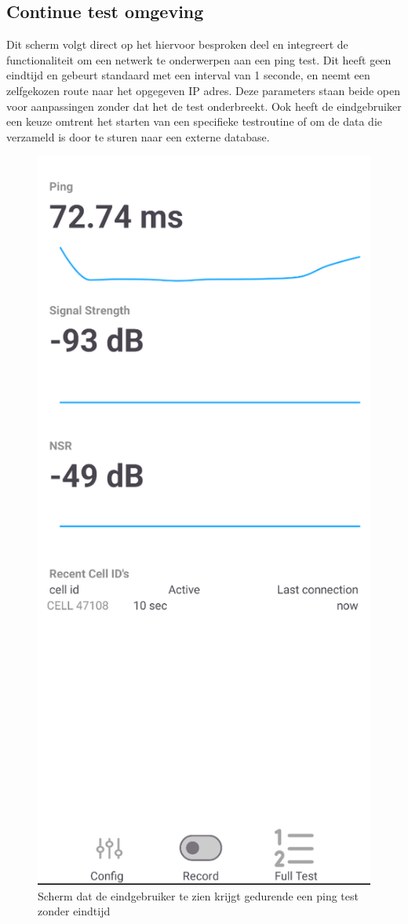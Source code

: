 \subsection{Continue test omgeving}

Dit scherm volgt direct op het hiervoor besproken deel en integreert de functionaliteit om een netwerk te onderwerpen aan een ping test. Dit heeft geen eindtijd en gebeurt standaard met een interval van 1 seconde, en neemt een zelfgekozen route naar het opgegeven IP adres. Deze parameters staan beide open voor aanpassingen zonder dat het de test onderbreekt. Ook heeft de eindgebruiker een keuze omtrent het starten van een specifieke testroutine of om de data die verzameld is door te sturen naar een externe database. 

\begin{figure}[!htb]
    \includegraphics[width=0.3\linewidth]{graphics/continuousping}
    \caption[Scherm dat de eindgebruiker te zien krijgt gedurende een ping test zonder eindtijd]{Scherm dat de eindgebruiker te zien krijgt gedurende een ping test zonder eindtijd}
    \label{fig:continuousping}
\end{figure}